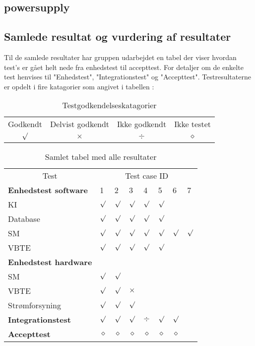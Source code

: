 \subsection{powersupply}

\subsection{Samlede resultat og vurdering af resultater}
Til de samlede resultater har gruppen udarbejdet en tabel der viser hvordan test's er gået helt nede fra enhedstest til accepttest. For detaljer om de enkelte test henvises til "Enhedstest", "Integrationstest" og "Accepttest". Testresultaterne er opdelt i fire katagorier som angivet i tabellen :
\begin{table}[H]
\centering
\begin{tabular}{cccc}
\hline
Godkendt 	& Delvist godkendt 	& Ikke godkendt & Ikke testet \\
\cmidrule(r){1-1} \cmidrule(r){2-2} \cmidrule(r){3-3} \cmidrule(r){4-4}
$\surd$		& $\times$		& $\div$ & $\diamond$	\\\hline
\end{tabular}
\caption{Testgodkendelseskatagorier}
\end{table}
\begin{table}[H]
\centering
\begin{tabular}{llllllll}
\hline
\multicolumn{1}{c}{Test} & \multicolumn{7}{c}{Test case ID}\\
\cmidrule(r){1-1} \cmidrule(r){2-8} 
\textbf{Enhedstest software} & 1 & 2 & 3 & 4 & 5 & 6 & 7\\
\hline
\phantom{mm}KI  		& $\surd$ & $\surd$ & $\surd$ & $\surd$ & $\surd$ \\
\phantom{mm}Database  	& $\surd$ & $\surd$ & $\surd$ & $\surd$ & $\surd$ \\
\phantom{mm}SM			& $\surd$ & $\surd$ & $\surd$ & $\surd$ & $\surd$ &  $\surd$ & $\surd$\\
\phantom{mm}VBTE  		& $\surd$ & $\surd$ & $\surd$ & $\surd$ & $\surd$ \\ 
\textbf{Enhedstest hardware} \\
\hline
\phantom{mm}SM			& $\surd$ & $\surd$\\
\phantom{mm}VBTE  		& $\surd$ & $\surd$ & $\times$ \\ 
\phantom{mm}Strømforsyning & $\surd$ & $\surd$ & $\surd$\\
\hline
\textbf{Integrationstest} & $\surd$ & $\surd$ & $\surd$ & $\div$ & $\surd$ & $\surd$\\
\textbf{Accepttest} & $\diamond$ & $\diamond$ & $\diamond$ & $\diamond$ & $\diamond$ & $\diamond$\\
\hline
\end{tabular}
\caption{Samlet tabel med alle resultater}
\label{table:alle test samlet}
\end{table}
